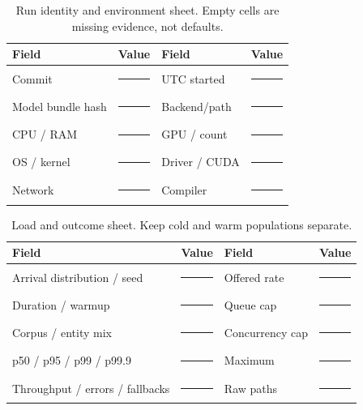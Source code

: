 \documentclass[10pt,a4paper,twocolumn]{article}
\begin{document}
\begin{table}[h]\centering\small
\caption{Run identity and environment sheet. Empty cells are missing evidence, not defaults.}
\begin{tabularx}{\textwidth}{@{}p{}Yp{.16\textwidth}Y@{}}\toprule
Field & Value & Field & Value \\\midrule
Commit & \rule{.28\textwidth}{.35pt} & UTC started & \rule{.22\textwidth}{.35pt}\\[7pt]
Model bundle hash & \rule{.28\textwidth}{.35pt} & Backend/path & \rule{.22\textwidth}{.35pt}\\[7pt]
CPU / RAM & \rule{.28\textwidth}{.35pt} & GPU / count & \rule{.22\textwidth}{.35pt}\\[7pt]
OS / kernel & \rule{.28\textwidth}{.35pt} & Driver / CUDA & \rule{.22\textwidth}{.35pt}\\[7pt]
Network & \rule{.28\textwidth}{.35pt} & Compiler & \rule{.22\textwidth}{.35pt}\\[7pt]
\bottomrule\end{tabularx}\end{table}

\begin{table}[h]\centering\small
\caption{Load and outcome sheet. Keep cold and warm populations separate.}
\begin{tabularx}{\textwidth}{@{}p{}Yp{.16\textwidth}Y@{}}\toprule
Field & Value & Field & Value \\\midrule
Arrival distribution / seed & \rule{.28\textwidth}{.35pt} & Offered rate & \rule{.22\textwidth}{.35pt}\\[7pt]
Duration / warmup & \rule{.28\textwidth}{.35pt} & Queue cap & \rule{.22\textwidth}{.35pt}\\[7pt]
Corpus / entity mix & \rule{.28\textwidth}{.35pt} & Concurrency cap & \rule{.22\textwidth}{.35pt}\\[7pt]
p50 / p95 / p99 / p99.9 & \rule{.28\textwidth}{.35pt} & Maximum & \rule{.22\textwidth}{.35pt}\\[7pt]
Throughput / errors / fallbacks & \rule{.28\textwidth}{.35pt} & Raw paths & \rule{.22\textwidth}{.35pt}\\[7pt]
\bottomrule\end{tabularx}\end{table}
\end{document}
